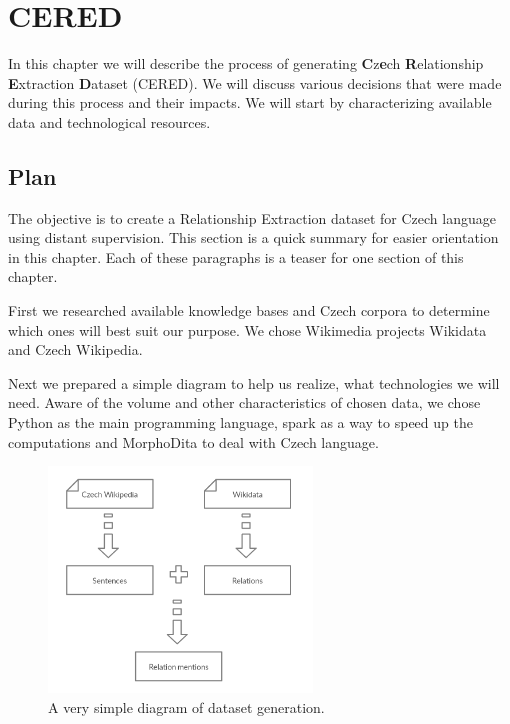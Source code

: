 \chapter{CERED}

In this chapter we will describe the process of generating \textbf{C}z\textbf{e}ch \textbf{R}elationship \textbf{E}xtraction \textbf{D}ataset (CERED). We will discuss various decisions that were made during this process and their impacts. 
We will start by characterizing available data and technological resources. 





\section{Plan}

The objective is to create a Relationship Extraction dataset for Czech language using distant supervision. This section is a quick summary for easier orientation in this chapter. Each of these paragraphs is a teaser for one section of this chapter.

First we researched available knowledge bases and Czech corpora to determine which ones will best suit our purpose. We chose Wikimedia projects Wikidata and Czech Wikipedia. 

Next we prepared a simple diagram to help us realize, what technologies we will need.  Aware of the volume and other characteristics of chosen data, we chose Python as the main programming language, spark as a way to speed up the computations and MorphoDita to deal with Czech language. 

\begin{figure}[h]
\begin{center}
\includegraphics[width=70mm, height=60mm]{./img/a_very_simple_diagram}
\caption{A very simple diagram of dataset generation.}
\label{obr02:AVerySimple}
\end{center}
\end{figure}

